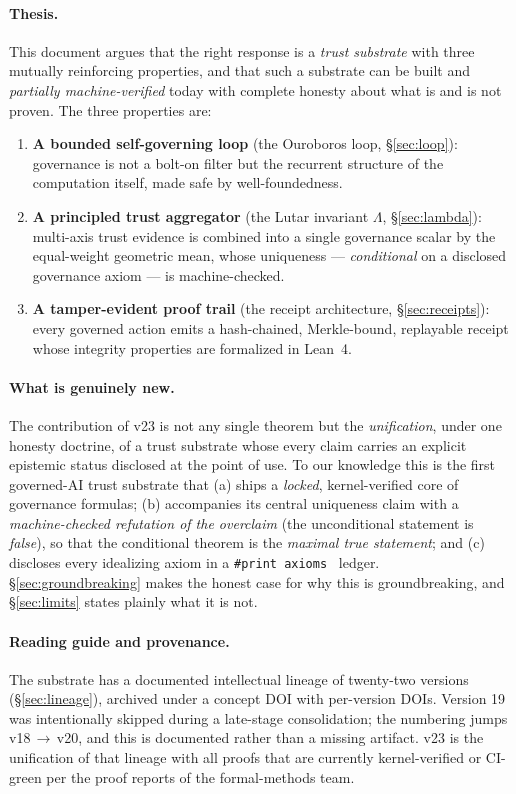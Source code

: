 \documentclass[11pt]{article}
\theoremstyle{plain}
\theoremstyle{definition}
\theoremstyle{remark}
\newcommand{\La}{\Lambda}
\newcommand{\printax}[1]{\texttt{\#print axioms}~\texttt{#1}}
\begin{document}
\paragraph{Thesis.}
This document argues that the right response is a \emph{trust substrate} with three
mutually reinforcing properties, and that such a substrate can be built and
\emph{partially machine-verified} today with complete honesty about what is and is
not proven. The three properties are:
\begin{enumerate}[leftmargin=2em,itemsep=2pt]
  \item \textbf{A bounded self-governing loop} (the Ouroboros loop,
    \S\ref{sec:loop}): governance is not a bolt-on filter but the recurrent
    structure of the computation itself, made safe by well-foundedness.
  \item \textbf{A principled trust aggregator} (the Lutar invariant $\La$,
    \S\ref{sec:lambda}): multi-axis trust evidence is combined into a single
    governance scalar by the equal-weight geometric mean, whose uniqueness ---
    \emph{conditional} on a disclosed governance axiom --- is machine-checked.
  \item \textbf{A tamper-evident proof trail} (the receipt architecture,
    \S\ref{sec:receipts}): every governed action emits a hash-chained,
    Merkle-bound, replayable receipt whose integrity properties are formalized in
    Lean~4.
\end{enumerate}

\paragraph{What is genuinely new.}
The contribution of v23 is not any single theorem but the \emph{unification},
under one honesty doctrine, of a trust substrate whose every claim carries an
explicit epistemic status disclosed at the point of use. To our knowledge this is
the first governed-AI trust substrate that (a) ships a \emph{locked},
kernel-verified core of governance formulas; (b) accompanies its central
uniqueness claim with a \emph{machine-checked refutation of the overclaim} (the
unconditional statement is \emph{false}), so that the conditional theorem is the
\emph{maximal true statement}; and (c) discloses every idealizing axiom in a
\printax{} ledger. \S\ref{sec:groundbreaking} makes the honest case for why this is
groundbreaking, and \S\ref{sec:limits} states plainly what it is not.

\paragraph{Reading guide and provenance.}
The substrate has a documented intellectual lineage of twenty-two versions
(\S\ref{sec:lineage}), archived under a concept DOI with per-version DOIs. Version
19 was intentionally skipped during a late-stage consolidation; the numbering jumps
v18\,$\to$\,v20, and this is documented rather than a missing artifact. v23 is the
unification of that lineage with all proofs that are currently kernel-verified or
CI-green per the proof reports of the formal-methods team.
\end{document}
